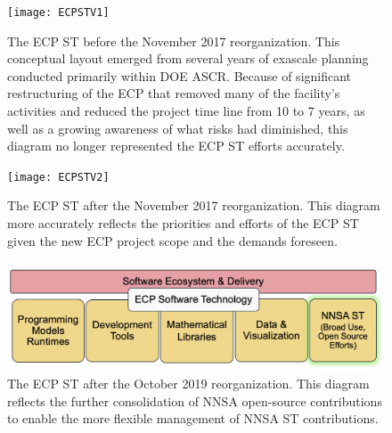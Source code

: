 \begin{figure}
	\centering
	\texttt{[image: ECPSTV1]}
	\caption{The ECP ST before the November 2017 reorganization.  This conceptual layout emerged from several years of exascale planning conducted primarily within DOE ASCR.  Because of significant restructuring of the ECP that removed many of the facility's activities and reduced the project time line from 10 to 7 years, as well as a growing awareness of what risks had diminished, this diagram no longer represented the ECP ST efforts accurately.}
	\label{fig:ecpstv1}
\end{figure}
\begin{figure}
	\centering
	\texttt{[image: ECPSTV2]}
	\caption{The ECP ST after the November 2017 reorganization.  This diagram more accurately reflects the priorities and efforts of the ECP ST given the new ECP project scope and the demands foreseen.}
	\label{fig:ecpstv2}
\end{figure}
\begin{figure}
	\centering
	\includegraphics[width=0.9\linewidth]{ECPSTV3}
	\caption{The ECP ST after the October 2019 reorganization.  This diagram reflects the further consolidation of NNSA open-source contributions to enable the more flexible management of NNSA ST contributions.}
\end{figure}
